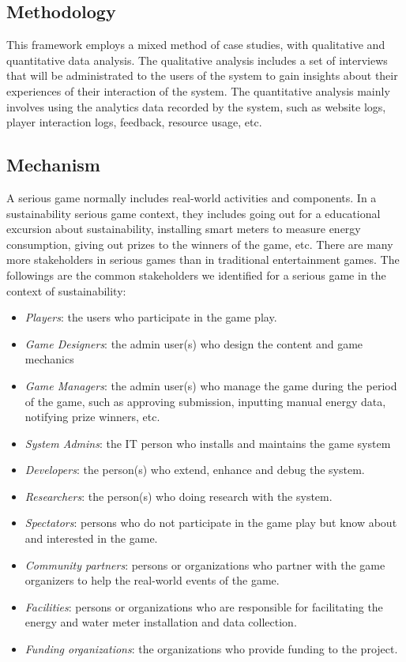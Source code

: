 \documentclass{sigchi}
\begin{document}
\subsection{Methodology}
This framework employs a mixed method of case studies, with qualitative and quantitative data analysis. The qualitative analysis includes a set of interviews that will be administrated to the users of the system to gain insights about their experiences of their interaction of the system. The quantitative analysis mainly involves using the analytics data recorded by the system, such as website logs, player interaction logs,  feedback, resource usage, etc.

\subsection{Mechanism}

A serious game normally includes real-world activities and components. In a sustainability  serious game context, they includes going out for a educational excursion about sustainability, installing smart meters to measure energy consumption, giving out prizes to the winners of the game, etc. There are many more stakeholders in serious games than in traditional entertainment games. The followings are the common stakeholders we identified for a serious game in the context of sustainability:

\begin{itemize}
\item \emph{Players}: the users who participate in the game play.
\item \emph{Game Designers}: the admin user(s) who design the content and game mechanics
 \item \emph{Game Managers}: the admin user(s) who manage the game during the period of the game, such as approving submission, inputting manual energy data, notifying prize winners, etc.
\item \emph{System Admins}: the IT person who installs and maintains the game system
\item \emph{Developers}: the person(s) who extend, enhance and debug the system.
\item \emph{Researchers}: the person(s) who doing research with the system.
\item \emph{Spectators}: persons who do not participate in the game play but know about and interested in the game.
\item \emph{Community partners}: persons or organizations who partner with the game organizers to help the real-world events of the game.
\item \emph{Facilities}: persons or organizations who are responsible for facilitating the energy and water meter installation and data collection.
\item \emph{Funding organizations}: the organizations who provide funding to the project.
\end{itemize}
\end{document}

